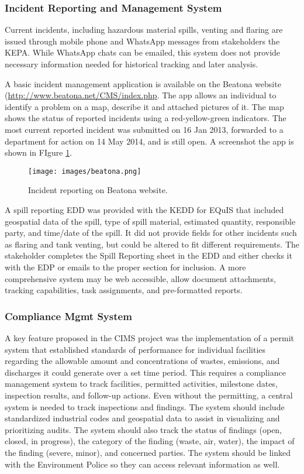 \subsubsection{Incident Reporting and Management System}
Current incidents, including hazardous material spills, venting and flaring are issued through mobile phone and WhatsApp messages from stakeholders the KEPA. While WhatsApp chats can be emailed, this system does not provide necessary information needed for historical tracking and later analysis. 

A basic incident management application is available on the Beatona website (\url{http://www.beatona.net/CMS/index.php}. The app allows an individual to identify a problem on a map, describe it and attached pictures of it. The map shows the status of reported incidents using a red-yellow-green indicators. The most current reported incident was submitted on 16 Jan 2013, forwarded to a department for action on 14 May 2014, and is still open. A screenshot the app is shown in FIgure \ref{fig:beatonat}.

%
\begin{figure}[H]
\centering
\texttt{[image: images/beatona.png]} 
\caption{Incident reporting on Beatona website.}
\label{fig:beatonat}
\end{figure}
%

A spill reporting EDD was provided with the KEDD for EQuIS that included geospatial data of the spill, type of spill material, estimated quantity, responsible party, and time/date of the spill. It did not provide fields for other incidents such as flaring and tank venting, but could be altered to fit different requirements. The stakeholder completes the Spill Reporting sheet in the EDD and either checks it with the EDP or emails to the proper section for inclusion. A more comprehensive system may be web accessible, allow document attachments, tracking capabilities, task assignments, and pre-formatted reports.

\subsubsection{Compliance Mgmt System}
A key feature proposed in the CIMS project was the implementation of a permit system that established standards of performance for individual facilities regarding the allowable amount and concentrations of wastes, emissions, and discharges it could generate over a set time period. This requires a compliance management system to track facilities, permitted activities, milestone dates, inspection results, and follow-up actions. Even without the permitting, a central system is needed to track inspections and findings. The system should include standardized industrial codes and geospatial data to assist in visualizing and prioritizing audits. The system should also track the status of findings (open, closed, in progress), the category of the finding (waste, air, water), the impact of the finding (severe, minor), and concerned parties. The system should be linked with the Environment Police so they can access relevant information as well.

